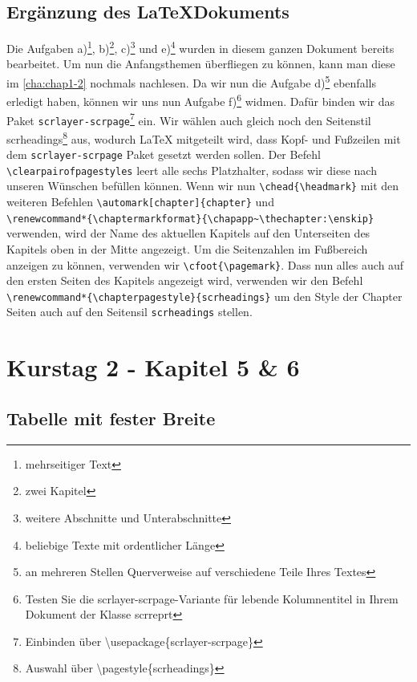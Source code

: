 \documentclass[
12pt,
ngerman
]{scrreprt}
\renewcommand*{\chaptermarkformat}{\chapapp~\thechapter:\enskip}
\renewcommand*{\chapterpagestyle}{scrheadings}
\begin{document}
\section{Ergänzung des \LaTeX \:Dokuments}
\label{sec:ergaenzung}
Die Aufgaben a)\footnote{mehrseitiger Text}, b)\footnote{zwei Kapitel}, c)\footnote{weitere Abschnitte und Unterabschnitte} und e)\footnote{beliebige Texte mit ordentlicher Länge} wurden in diesem ganzen Dokument bereits bearbeitet. Um nun  die Anfangsthemen überfliegen zu können, kann man diese im \cref{cha:chap1-2} nochmals nachlesen. Da wir nun die Aufgabe d)\footnote{an mehreren Stellen Querverweise auf verschiedene Teile Ihres Textes} ebenfalls erledigt haben, können wir uns nun Aufgabe f)\footnote{Testen Sie die scrlayer-scrpage-Variante für lebende Kolumnentitel in Ihrem
Dokument der Klasse scrreprt} widmen. Dafür binden wir das Paket \verb!scrlayer-scrpage!\footnote{\label{fn:scrlayer-scrpage}Einbinden über \textbackslash usepackage\{scrlayer-scrpage\}} ein. Wir wählen auch gleich noch den Seitenstil scrheadings\footnote{\label{fn:scrheadings}Auswahl über \textbackslash pagestyle\{scrheadings\}} aus, wodurch LaTeX mitgeteilt wird, dass Kopf- und Fußzeilen mit dem \verb!scrlayer-scrpage! Paket gesetzt werden sollen. Der Befehl \verb!\clearpairofpagestyles! leert alle sechs Platzhalter, sodass wir diese nach unseren Wünschen befüllen können. Wenn wir nun \verb!\chead{\headmark}! mit den weiteren Befehlen \verb!\automark[chapter]{chapter}! und \\ \verb!\renewcommand*{\chaptermarkformat}{\chapapp~\thechapter:\enskip}! verwenden, wird der Name des aktuellen Kapitels auf den Unterseiten des Kapitels oben in der Mitte angezeigt.
Um die Seitenzahlen im Fußbereich anzeigen zu können, verwenden wir \verb!\cfoot{\pagemark}!. Dass nun alles auch auf den ersten Seiten des Kapitels angezeigt wird, verwenden wir den Befehl \verb!\renewcommand*{\chapterpagestyle}{scrheadings}! um den Style der Chapter Seiten auch auf den Seitensil \verb!scrheadings! stellen.


\chapter{Kurstag 2 - Kapitel 5 \& 6}
\label{cha:chap5-6}
\label{blatt:3}

\section{Tabelle mit fester Breite}
\label{sec:table-fixed}
\end{document}
